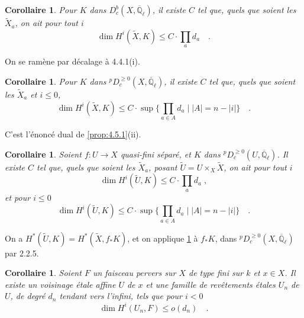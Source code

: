 \documentclass[12pt,a4paper]{article}
\theoremstyle{plain}
\newtheorem{corollary}[theorem]{Corollaire}
\theoremstyle{definition}
\begin{document}
\begin{corollary}\label{cor:4.5.2}
Pour $K$ dans $D_{c}^{b}(X,\overline{\mathbb{Q}}_{\ell})$, il existe $C$ tel que, quels que soient les $\tilde{X}_{a}$, on ait pour tout $i$
\[
\dim H^{i}(\tilde{X}, K) \leq C \cdot \prod_{a} d_{a}\quad.
\]
\end{corollary}
On se ram\`{e}ne par d\'{e}calage \`{a} 4.4.1(i).

\begin{corollary}\label{cor:4.5.3}
Pour $K$ dans ${}^{p}D_{c}^{\geq 0}(X,\overline{\mathbb{Q}}_{\ell})$, il existe $C$ tel que, quels que soient les $\tilde{X}_{a}$ et $i \leq 0$,
\[
\dim H^{i}(\tilde{X}, K) \leq C \cdot \sup\{\prod_{a \in A} d_{a} \mid |A| = n-|i|\}\quad.
\]
\end{corollary}
C'est l'\'{e}nonc\'{e} dual de \ref{prop:4.5.1}(ii).

\begin{corollary}\label{cor:4.5.4}
Soient $f: U \to X$ quasi-fini s\'{e}par\'{e}, et $K$ dans ${}^{p}D_{c}^{\geq 0}(U,\overline{\mathbb{Q}}_{\ell})$. Il existe $C$ tel que, quels que soient les $\tilde{X}_{a}$, posant $\tilde{U} = U \times_{X} \tilde{X}$, on ait pour tout $i$
\[
\dim H^{i}(\tilde{U}, K) \leq C \cdot \prod_{a} d_{a}\;,
\]
et pour $i \leq 0$
\[
\dim H^{i}(\tilde{U}, K) \leq C \cdot \sup\{\prod_{a \in A} d_{a} \mid |A| = n-|i|\}\quad.
\]
\end{corollary}
On a $H^{*}({\tilde{U}}, K) = H^{*}(\tilde{X}, f_{*}K)$, et on applique \ref{cor:4.5.3} \`{a} $f_{*}K$, dans ${}^{p}D_{c}^{\geq 0}(X,\overline{\mathbb{Q}}_{\ell})$ par 2.2.5.

\begin{corollary}\label{cor:4.5.5}
Soient $F$ un faisceau pervers sur $X$ de type fini sur $k$ et $x \in X$. Il existe un voisinage \'{e}tale affine $U$ de $x$ et une famille de rev\^{e}tements \'{e}tales $U_{n}$ de $U$, de degr\'{e} $d_{n}$ tendant vers l'infini, tels que pour $i < 0$
\[
\dim H^{i}(U_{n}, F) \leq o(d_{n})\quad.
\]
\end{corollary}
\end{document}
